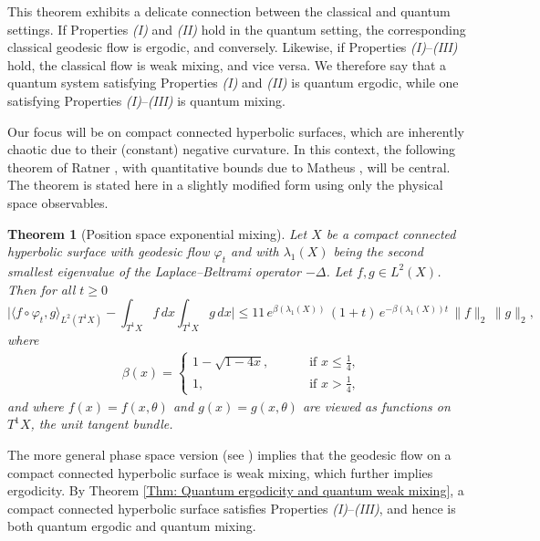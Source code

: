 \documentclass[11pt,twoside,reqno]{amsart} \usepackage{a4wide} \usepackage[T1]{fontenc} \usepackage[utf8]{inputenc} \usepackage{soul}  \usepackage{amsmath} \usepackage{amsfonts} \usepackage{amssymb} \usepackage{mathtools} \usepackage{amsthm} \usepackage{xcolor} \usepackage{graphicx} \usepackage{hyperref} \usepackage{standalone} \usepackage{esint} \usepackage{comment} \usepackage[left=2.3cm,top=3cm,right=2.3cm]{geometry} \usepackage{bm} \usepackage{svg} \usepackage{float} \numberwithin{equation}{section} \theoremstyle{plain} \newtheorem{thm}{Theorem}[section] \newtheorem{theorem}[thm]{Theorem} \newtheorem*{theorem*}{Theorem}\newtheorem{conj}[thm]{Conjecture} \newtheorem{lemma}[thm]{Lemma} \newtheorem{prop}[thm]{Proposition} \newtheorem{proposition}[thm]{Proposition} \newtheorem{cor}[thm]{Corollary} \newtheorem{question}[thm]{Question} \newtheorem{corollary}[thm]{Corollary} \newtheorem{assumption}[thm]{Assumption} \theoremstyle{definition} \newtheorem{defn}[thm]{Definition} \newtheorem{choice}[thm]{Choice} \newtheorem{definition}[thm]{Definition} \newtheorem{ex}[thm]{Example} \newtheorem{notation}[thm]{Notation} \newtheorem*{ack}{Acknowledgements} \theoremstyle{remark} \newtheorem{remark}[thm]{Remark} \newtheorem{bigremark}[thm]{Remark} \usepackage{xcolor} \newcommand{\red}[1]{ {\color{Red}#1} } \newcommand{\blue}[1]{ {\color{Blue}#1} } \author{Kai Hippi} \address{Aalto University, Espoo, Finland} \email{kai.hippi@aalto.fi}
\begin{document}
This theorem exhibits a delicate connection between the classical and quantum settings. If Properties \emph{(I)} and \emph{(II)} hold in the quantum setting, the corresponding classical geodesic flow is ergodic, and conversely. Likewise, if Properties \emph{(I)}--\emph{(III)} hold, the classical flow is weak mixing, and vice versa. We therefore say that a quantum system satisfying Properties \emph{(I)} and \emph{(II)} is quantum ergodic, while one satisfying Properties \emph{(I)}--\emph{(III)} is quantum mixing.

Our focus will be on compact connected hyperbolic surfaces, which are inherently chaotic due to their (constant) negative curvature. In this context, the following theorem of Ratner \cite{Rat87}, with quantitative bounds due to Matheus \cite{Mat13}, will be central. The theorem is stated here in a slightly modified form using only the physical space observables.

\begin{theorem}[Position space exponential mixing]
\label{Thm: Exponential mixing}
Let $X$ be a compact connected hyperbolic surface with geodesic flow $ \varphi_{t} $ and with $\lambda_1( X )$ being the second smallest eigenvalue of the Laplace--Beltrami operator $ -\Delta $. Let $f,g \in L^2(X)$. Then for all $t \ge 0$
\[
\bigg| \big\langle f \circ \varphi_t, g \big\rangle_{L^2(T^1X)} 
- \int_{T^1X} f\,dx \int_{T^1X} g\,dx \bigg|
\leq 11 \, e^{ \beta( \lambda_{1}( X ) ) } \, ( 1 + t ) \, e^{- \beta(\lambda_1( X ) ) t} \, 
\|f\|_2 \, \|g\|_2,
\]
where
\begin{align*}
	&
	\beta( x ) = 
	\begin{cases}	
		1 - \sqrt{1 - 4x}, \qquad & \text{ if } x \leq \frac{1}{4},
		\\
		1, \qquad & \text{ if } x > \frac{1}{4},
	\end{cases}
\end{align*}
and where $f(x) = f(x,\theta)$ and $g(x) = g(x,\theta)$ are viewed as functions on $T^1X$, the unit tangent bundle.

\end{theorem}

The more general phase space version (see \cite{Rat87, Mat13}) implies that the geodesic flow on a compact connected hyperbolic surface is weak mixing, which further implies ergodicity. By Theorem \ref{Thm: Quantum ergodicity and quantum weak mixing}, a compact connected hyperbolic surface satisfies Properties \emph{(I)}--\emph{(III)}, and hence is both quantum ergodic and quantum mixing.
\end{document}
